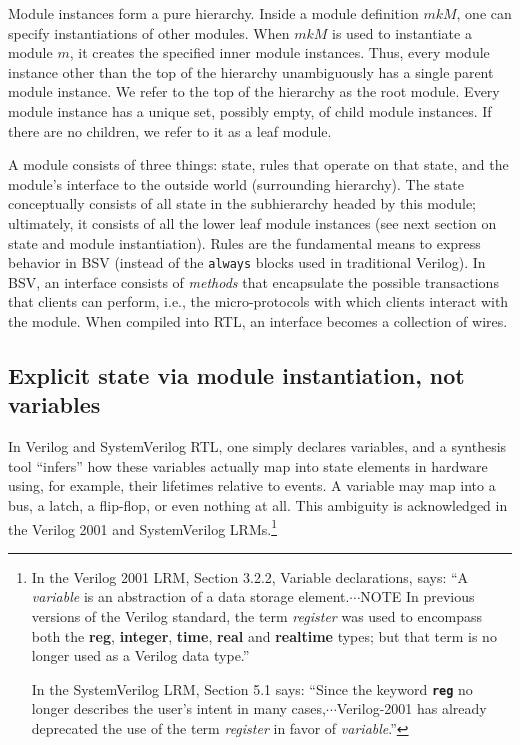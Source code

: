 \documentclass[twoside,letterpaper]{article}
\newcommand{\BSV}{BSV}
\newcommand{\SV}{SystemVerilog}
\newcommand{\V}{Verilog}
\newcommand{\VTwoK}{Verilog 2001}
\begin{document}
Module instances form a pure hierarchy.  Inside a module definition
$mkM$, one can specify instantiations of other modules.  When $mkM$ is
used to instantiate a module $m$, it creates the specified inner
module instances.  Thus, every module instance other than the top of
the hierarchy unambiguously has a single parent module instance.  We
refer to the top of the hierarchy as the root module.  Every module
instance has a unique set, possibly empty, of child module instances.
If there are no children, we refer to it as a leaf module.

A module consists of three things: state, rules that operate on that
state, and the module's interface to the outside world (surrounding
hierarchy).  The state conceptually consists of all state in the
subhierarchy headed by this module; ultimately, it consists of all
the lower leaf module instances (see next section on state and module
instantiation).  Rules are the fundamental means to express behavior
in {\BSV} (instead of the \texttt{always} blocks used in traditional
{\V}).  In {\BSV}, an interface consists of \emph{methods} that
encapsulate the possible transactions that clients can perform, i.e.,
the micro-protocols with which clients interact with the module.  When
compiled into RTL, an interface becomes a collection of wires.



\subsection{Explicit state via module instantiation, not variables}

In {\V} and {\SV} RTL, one simply declares variables, and a synthesis
tool ``infers'' how these variables actually map into state elements
in hardware using, for example, their lifetimes relative to events.  A
variable may map into a bus, a latch, a flip-flop, or even nothing at
all.  This ambiguity is acknowledged in the {\VTwoK} and {\SV}
LRMs.\footnote{In the {\VTwoK} LRM, Section 3.2.2, Variable
declarations, says: ``A \emph{variable} is an abstraction of a data
storage element.$\cdots$NOTE In previous versions of the Verilog
standard, the term \emph{register} was used to encompass both the {\bf
reg}, {\bf integer}, {\bf time}, {\bf real} and {\bf realtime} types;
but that term is no longer used as a Verilog data type.''

In the {\SV} LRM, Section 5.1 says: ``Since the keyword {\bf\tt reg}
no longer describes the user's intent in many
cases,$\cdots$Verilog-2001 has already deprecated the use of the term
\emph{register} in favor of \emph{variable}.''}
\end{document}
